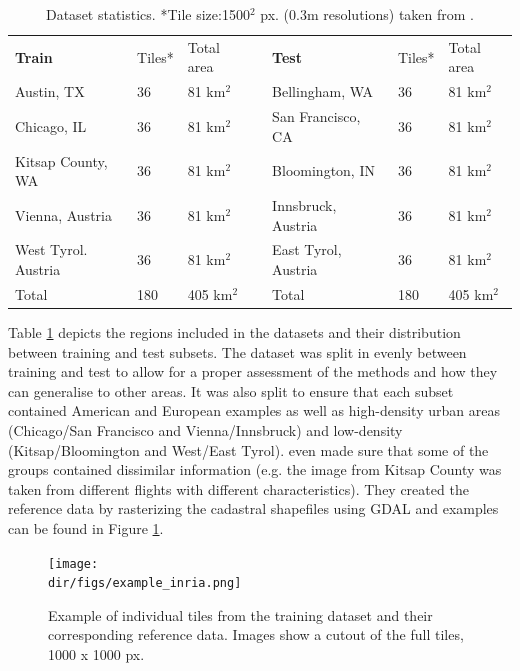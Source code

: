 \begin{table}[htpb]
\centering
\begin{adjustbox}{width=1\textwidth,center=\textwidth}
\begin{tabular}{l|llll|ll}
\textbf{Train}      & Tiles* & Total area &  & \textbf{Test}       & Tiles* & Total area \\ \cline{1-3} \cline{5-7} 
Austin, TX          & 36     & 81 km$^2$     &  & Bellingham, WA      & 36     & 81 km$^2$     \\
Chicago, IL         & 36     & 81 km$^2$     &  & San Francisco, CA   & 36     & 81 km$^2$     \\
Kitsap County, WA   & 36     & 81 km$^2$     &  & Bloomington, IN     & 36     & 81 km$^2$     \\
Vienna, Austria     & 36     & 81 km$^2$     &  & Innsbruck, Austria  & 36     & 81 km$^2$     \\
West Tyrol. Austria & 36     & 81 km$^2$     &  & East Tyrol, Austria & 36     & 81 km$^2$     \\
Total               & 180    & 405 km$^2$    &  & Total               & 180    & 405 km$^2$   
\end{tabular}
\end{adjustbox}
\caption[Dataset statistics.]{Dataset statistics. *Tile size:1500$^2$ px. (0.3m resolutions) taken from \cite{maggiori17a}.}
\label{tab.inria_dataset}
\end{table}

Table \ref{tab.inria_dataset} depicts the regions included in the datasets and their distribution between training and test subsets. The dataset was split in evenly between training and test to allow for a proper assessment of the methods and how they can generalise to other areas. It was also split to ensure that each subset contained American and European examples as well as high-density urban areas (Chicago/San Francisco and Vienna/Innsbruck) and low-density (Kitsap/Bloomington and West/East Tyrol). \cite{maggiori17a} even made sure that some of the groups contained dissimilar information (e.g. the image from Kitsap County was taken from different flights with different characteristics). They created the reference data by rasterizing the cadastral shapefiles using GDAL and examples can be found in Figure \ref{fig.inria_dataset}.

\begin{figure}[htpb]
    \centering
    \texttt{[image: \\dir/figs/example\_inria.png]}
    \caption[Examples from the INRIA Image Labelling Dataset]{Example of individual tiles from the training dataset and their corresponding reference data. Images show a cutout of the full tiles, 1000 x 1000 px.}
    \label{fig.inria_dataset}
\end{figure}

